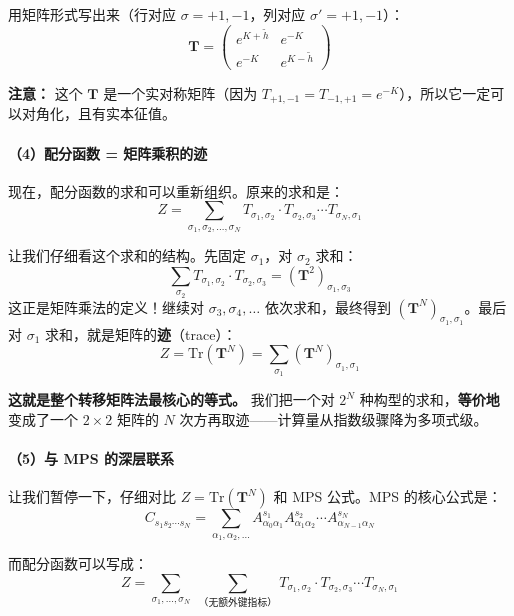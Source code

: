 \documentclass[12pt,a4paper]{ctexart}
\begin{document}
用矩阵形式写出来（行对应 $\sigma = +1, -1$，列对应 $\sigma' = +1, -1$）：
\begin{equation}
\boxed{
\mathbf{T} = \begin{pmatrix} e^{K + \tilde{h}} & e^{-K} \\ e^{-K} & e^{K - \tilde{h}} \end{pmatrix}
}
\end{equation}

\textbf{注意：} 这个 $\mathbf{T}$ 是一个实对称矩阵（因为 $T_{+1,-1} = T_{-1,+1} = e^{-K}$），所以它一定可以对角化，且有实本征值。

\paragraph{（4）配分函数 = 矩阵乘积的迹}

现在，配分函数的求和可以重新组织。原来的求和是：
\[
Z = \sum_{\sigma_1, \sigma_2, \ldots, \sigma_N} T_{\sigma_1, \sigma_2} \cdot T_{\sigma_2, \sigma_3} \cdots T_{\sigma_N, \sigma_1}
\]

让我们仔细看这个求和的结构。先固定 $\sigma_1$，对 $\sigma_2$ 求和：
\[
\sum_{\sigma_2} T_{\sigma_1, \sigma_2} \cdot T_{\sigma_2, \sigma_3} = (\mathbf{T}^2)_{\sigma_1, \sigma_3}
\]
这正是矩阵乘法的定义！继续对 $\sigma_3, \sigma_4, \ldots$ 依次求和，最终得到 $(\mathbf{T}^N)_{\sigma_1, \sigma_1}$。最后对 $\sigma_1$ 求和，就是矩阵的\textbf{迹}（trace）：
\begin{equation}
\boxed{
Z = \mathrm{Tr}\!\left(\mathbf{T}^N\right) = \sum_{\sigma_1} (\mathbf{T}^N)_{\sigma_1, \sigma_1}
}
\end{equation}

\textbf{这就是整个转移矩阵法最核心的等式。} 我们把一个对 $2^N$ 种构型的求和，\textbf{等价地}变成了一个 $2 \times 2$ 矩阵的 $N$ 次方再取迹——计算量从指数级骤降为多项式级。

\paragraph{（5）与 MPS 的深层联系}

让我们暂停一下，仔细对比 $Z = \mathrm{Tr}(\mathbf{T}^N)$ 和 MPS 公式。MPS 的核心公式是：
\[
C_{s_1 s_2 \cdots s_N} = \sum_{\alpha_1, \alpha_2, \ldots} A^{s_1}_{\alpha_0 \alpha_1} A^{s_2}_{\alpha_1 \alpha_2} \cdots A^{s_N}_{\alpha_{N-1} \alpha_N}
\]

而配分函数可以写成：
\[
Z = \sum_{\sigma_1, \ldots, \sigma_N} \; \sum_{\text{（无额外键指标）}} T_{\sigma_1, \sigma_2} \cdot T_{\sigma_2, \sigma_3} \cdots T_{\sigma_N, \sigma_1}
\]
\end{document}
